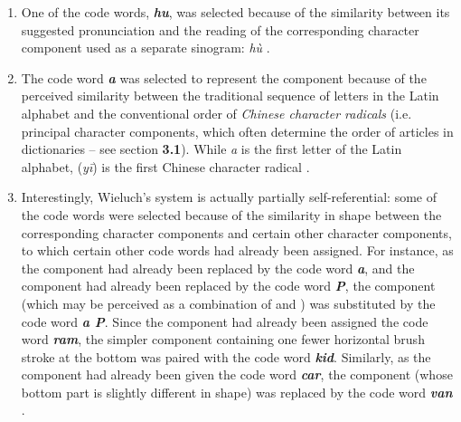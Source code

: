 \documentclass[output=paper,colorlinks,citecolor=brown,arabicfont,chinesefont]{langscibook}
\begin{document}
\begin{enumerate}
    \item One of the code words, \textbf{\emph{hu}}, was selected because of the similarity between its suggested pronunciation and the reading of the corresponding character component used as a separate sinogram: {} \emph{hù} \citep[9\textsubscript{p}, \emph{Tables I \& II})]{Wieluch1936}.
    \item The code word \textbf{\emph{a}} was selected to represent the component {} because of the perceived similarity between the traditional sequence of letters in the Latin alphabet and the conventional order of \emph{Chinese character radicals} (i.e. principal character components, which often determine the order of articles in dictionaries – see section \textbf{3.1}). While \emph{a} is the first letter of the Latin alphabet, {} (\emph{yī}) is the first Chinese character radical \citep[4\textsubscript{p}, \emph{Tables I \& II)}] {Wieluch1936}.
    \item Interestingly, Wieluch's system is actually partially self-referential: some of the code words were selected because of the similarity in shape between the corresponding character components and certain other character components, to which certain other code words had already been assigned. For instance, as the component {} had already been replaced by the code word \textbf{\emph{a}}, and the component {} had already been replaced by the code word \textbf{\emph{P}}, the component {} (which may be perceived as a combination of {} and {}) was substituted by the code word \textbf{\emph{a P}}. Since the component {} had already been assigned the code word \textbf{\emph{ram}}, the simpler component containing one fewer horizontal brush stroke at the bottom was paired with the code word \textbf{\emph{kid}}. Similarly, as the component {} had already been given the code word \textbf{\emph{car}}, the component {} (whose bottom part is slightly different in shape) was replaced by the code word \textbf{\emph{van}} \citep[4\textsubscript{p}, 9\textsubscript{p}, \emph{Tables I \& II}]{Wieluch1936}.
\end{enumerate}
\end{document}
